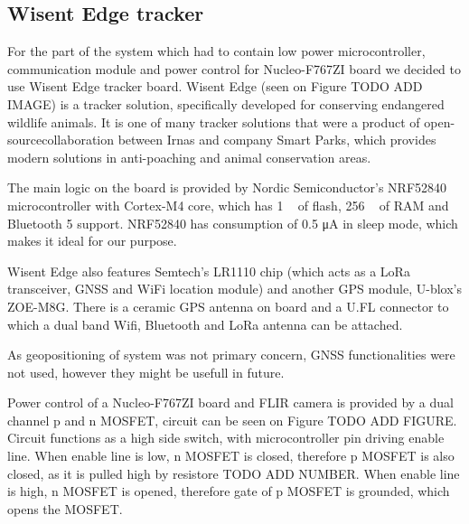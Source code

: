 \subsection{ Wisent Edge tracker}

For the part of the system which had to contain low power microcontroller, communication module and power control for Nucleo-F767ZI board we decided to use Wisent Edge tracker board.
Wisent Edge (seen on Figure TODO ADD IMAGE) is a tracker solution, specifically developed for conserving endangered wildlife animals.
It is one of many tracker solutions that were a product of open-source\footnotemark collaboration between Irnas and company Smart Parks, which provides modern solutions in anti-poaching and animal conservation areas.


The main logic on the board is provided by Nordic Semiconductor's NRF52840 microcontroller with Cortex-M4 core, which has 1 \si{\mega\byte} of flash, 256 \si{\kilo\byte} of RAM and Bluetooth 5 support.
NRF52840 has consumption of 0.5 \si{\micro\ampere} in sleep mode, which makes it ideal for our purpose.

Wisent Edge also features Semtech's LR1110 chip (which acts as a LoRa transceiver, GNSS and WiFi location module) and another GPS module, U-blox's ZOE-M8G\footnotemark.
There is a ceramic GPS antenna on board and a U.FL connector to which a dual band Wifi, Bluetooth and LoRa antenna can be attached.


As geopositioning of system was not primary concern, GNSS functionalities were not used, however they might be usefull in future.

Power control of a Nucleo-F767ZI board and FLIR camera is provided by a dual channel p and n MOSFET, circuit can be seen on Figure TODO ADD FIGURE.
Circuit functions as a high side switch, with microcontroller pin driving enable line.
When enable line is low, n MOSFET is closed, therefore p MOSFET is also closed, as it is pulled high by resistore TODO ADD NUMBER.
When enable line is high, n MOSFET is opened, therefore gate of p MOSFET is grounded, which opens the MOSFET.


